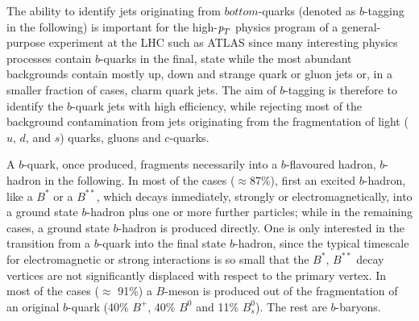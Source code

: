 

The ability to identify jets originating from $bottom$-quarks (denoted as $b$-tagging in the following) is important for the high-${\emph{p}_{T}}$ physics program of a general-purpose experiment at the LHC such as ATLAS since many interesting physics processes contain $b$-quarks in the final, state while the most abundant backgrounds contain mostly up, down and strange quark or gluon jets or, in a smaller fraction of cases, charm quark jets. The aim of $b$-tagging is therefore to identify the $b$-quark jets with high efficiency, while rejecting most of the background contamination from jets originating from the fragmentation of light ($u$, $d$, and $s$) quarks, gluons and $c$-quarks.

A $b$-quark, once produced, fragments necessarily into a $b$-flavoured hadron, $b$-hadron in the following. In most of the cases ($\approx$87\%), first an excited $b$-hadron, like a $B^{*}$ or a $B^{**}$, which decays inmediately, strongly or electromagnetically, into a ground state $b$-hadron plus one or more further particles; while in the remaining cases, a ground state $b$-hadron is produced directly.  One is only interested in the transition from a $b$-quark into the final state $b$-hadron, since the typical timescale for electromagnetic or strong interactions is so small that the  $B^{*}$, $B^{**}$ decay vertices are not significantly displaced with respect to the primary vertex.   In most of the cases ($\approx$ 91\%) a $B$-meson is produced out of the fragmentation of an original $b$-quark (40\% $B^+$, 40\% $B^0$ and 11\% $B^0_s$). The rest are $b$-baryons.

